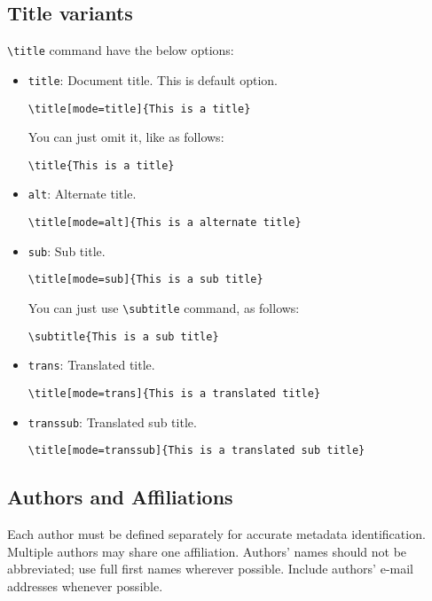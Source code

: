\documentclass[
 twocolumn,
 hf,
]{ceurart}
\begin{document}
\subsection{Title variants}

\verb|\title| command have the below options:
\begin{itemize}
\item \verb|title|: Document title. This is default option. 
\begin{lstlisting}
\title[mode=title]{This is a title}
\end{lstlisting}
You can just omit it, like as follows:
\begin{lstlisting}
\title{This is a title}
\end{lstlisting}

\item \verb|alt|: Alternate title.
\begin{lstlisting}
\title[mode=alt]{This is a alternate title}
\end{lstlisting}

\item \verb|sub|: Sub title.
\begin{lstlisting}
\title[mode=sub]{This is a sub title}
\end{lstlisting}
You can just use \verb|\subtitle| command, as follows:
\begin{lstlisting}
\subtitle{This is a sub title}
\end{lstlisting}

\item \verb|trans|: Translated title.
\begin{lstlisting}
\title[mode=trans]{This is a translated title}
\end{lstlisting}

\item \verb|transsub|: Translated sub title.
\begin{lstlisting}
\title[mode=transsub]{This is a translated sub title}
\end{lstlisting}
\end{itemize}

\subsection{Authors and Affiliations}

Each author must be defined separately for accurate metadata
identification. Multiple authors may share one affiliation. Authors'
names should not be abbreviated; use full first names wherever
possible. Include authors' e-mail addresses whenever possible.
\end{document}
